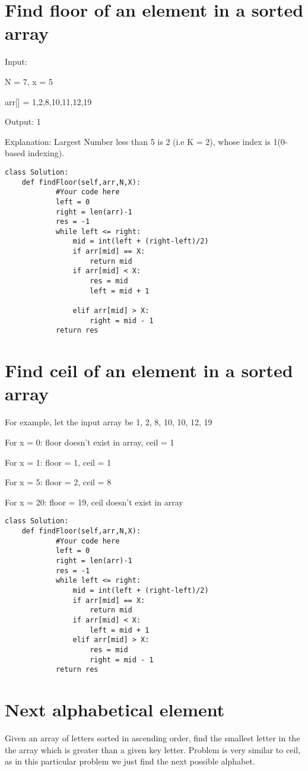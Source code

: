 \documentclass[24pt, a4]{article}
\begin{document}
\section{Find floor of an element in a sorted array}
Input:

N = 7, x = 5

arr[] = {1,2,8,10,11,12,19}

Output: 1

Explanation: Largest Number less than 5 is
2 (i.e K = 2), whose index is 1(0-based
indexing).
\begin{lstlisting}
class Solution:
    def findFloor(self,arr,N,X):
            #Your code here
            left = 0
            right = len(arr)-1
            res = -1
            while left <= right:
                mid = int(left + (right-left)/2)
                if arr[mid] == X:
                    return mid
                if arr[mid] < X:
                    res = mid
                    left = mid + 1
                
                elif arr[mid] > X:
                    right = mid - 1
            return res
\end{lstlisting}

\newpage
\section{Find ceil of an element in a sorted array}
For example, let the input array be {1, 2, 8, 10, 10, 12, 19}

For x = 0:    floor doesn't exist in array,  ceil  = 1

For x = 1:    floor  = 1,  ceil  = 1

For x = 5:    floor  = 2,  ceil  = 8

For x = 20:   floor  = 19,  ceil doesn't exist in array
\begin{lstlisting}
class Solution:
    def findFloor(self,arr,N,X):
            #Your code here
            left = 0
            right = len(arr)-1
            res = -1
            while left <= right:
                mid = int(left + (right-left)/2)
                if arr[mid] == X:
                    return mid
                if arr[mid] < X:
                    left = mid + 1
                elif arr[mid] > X:
                    res = mid
                    right = mid - 1
            return res
\end{lstlisting}

\section{Next alphabetical element}
Given an array of letters sorted in ascending order, find the smallest letter 
in the the array which is greater than a given key letter.
Problem is very similar to ceil, as in this particular problem we just find 
the next possible alphabet.
\end{document}
